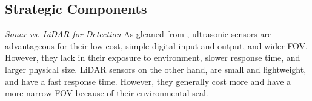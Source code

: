 \subsection{Strategic Components}

\noindent \underline{\textit{Sonar vs. LiDAR for Detection}} As gleaned from \cite{sonarvslidar}, ultrasonic sensors are advantageous for their low cost, simple digital input and output, and wider FOV. However, they lack in their exposure to environment, slower response time, and larger physical size. LiDAR sensors on the other hand, are small and lightweight, and have a fast response time. However, they generally cost more and have a more narrow FOV because of their environmental seal.\\